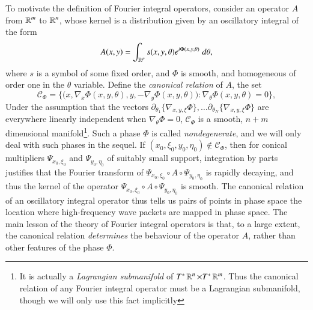 To motivate the definition of Fourier integral operators, consider an operator $A$ from $\operatorname{\mathbb{R}}^m$ to $\operatorname{\mathbb{R}}^n$, whose kernel is a distribution given by an oscillatory integral of the form
%
\begin{equation}
  A(x,y) = \int_{\operatorname{\mathbb{R}}^p} s(x,y,\theta) e^{i \Phi(x,y,\theta)}\; d\theta,
\end{equation}
%
where $s$ is a symbol of some fixed order, and $\Phi$ is smooth, and homogeneous of order one in the $\theta$ variable. Define the \emph{canonical relation} of $A$, the set
%
\begin{equation}
  \mathcal{C}_\Phi = \Big\{ \big(x, \nabla_x \Phi(x,y,\theta) ,y, -\nabla_y \Phi(x,y,\theta) \big) : \nabla_\theta \Phi(x,y,\theta) = 0 \Big\},
\end{equation}
%
Under the assumption that the vectors $\partial_{\theta_1} \{ \nabla_{x,y,\xi} \Phi \}, \dots \partial_{\theta_N} \{ \nabla_{x,y,\xi} \Phi \}$ are everywhere linearly independent when $\nabla_\theta \Phi = 0$, $\mathcal{C}_\Phi$ is a smooth, $n + m$ dimensional manifold\footnote{It is actually a \emph{Lagrangian submanifold} of $T^* \operatorname{\mathbb{R}}^n \times T^* \operatorname{\mathbb{R}}^m$. Thus the canonical relation of any Fourier integral operator must be a Lagrangian submanifold, though we will only use this fact implicitly}. Such a phase $\Phi$ is called \emph{nondegenerate}, and we will only deal with such phases in the sequel. If $(x_0,\xi_0,y_0,\eta_0) \not \in \mathcal{C}_\Phi$, then for conical multipliers $\Psi_{x_0,\xi_0}$ and $\Psi_{y_0,\eta_0}$ of suitably small support, integration by parts justifies that the Fourier transform of $\Psi_{x_0,\xi_0} \circ A \circ \Psi_{y_0,\eta_0}$ is rapidly decaying, and thus the kernel of the operator $\Psi_{x_0,\xi_0} \circ A \circ \Psi_{y_0,\eta_0}$ is smooth. The canonical relation of an oscillatory integral operator thus tells us pairs of points in phase space the location where high-frequency wave packets are mapped in phase space. The main lesson of the theory of Fourier integral operators is that, to a large extent, the canonical relation \emph{determines} the behaviour of the operator $A$, rather than other features of the phase $\Phi$.


